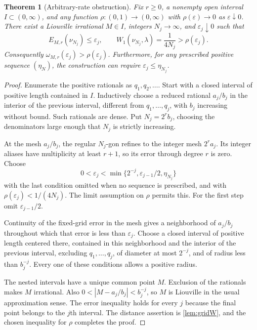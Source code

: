 \documentclass[11pt,a4paper]{article}
\numberwithin{equation}{section}
\theoremstyle{plain}
\newtheorem{theorem}{Theorem}[section]
\theoremstyle{definition}
\theoremstyle{remark}
\begin{document}
\begin{theorem}[Arbitrary-rate obstruction]\label{thm:liouville}
Fix $r\ge0$, a nonempty open interval $I\subset(0,\infty)$, and any function
$\rho:(0,1)\to(0,\infty)$ with $\rho(\varepsilon)\to0$ as
$\varepsilon\downarrow0$. There exist a Liouville irrational $M\in I$,
integers $N_j\to\infty$, and $\varepsilon_j\downarrow0$ such that
\begin{equation}\label{eq:liouville}
 E_{M,r}(\nu_{N_j})\le\varepsilon_j,
 \qquad
 W_1(\nu_{N_j},\lambda)=\frac1{4N_j}>\rho(\varepsilon_j).
\end{equation}
Consequently $\omega_{M,r}(\varepsilon_j)>\rho(\varepsilon_j)$.
Furthermore, for any prescribed positive sequence $(\eta_N)$, the construction
can require $\varepsilon_j\le\eta_{N_j}$.
\end{theorem}
\begin{proof}
Enumerate the positive rationals as $q_1,q_2,\ldots$. Start with a closed
interval of positive length contained in $I$. Inductively choose a reduced
rational $a_j/b_j$ in the interior of the previous interval, different from
$q_1,\ldots,q_j$, with $b_j$ increasing without bound. Such rationals are
dense. Put $N_j=2^r b_j$, choosing the denominators large enough that $N_j$
is strictly increasing.

At the mesh $a_j/b_j$, the regular $N_j$-gon refines to the integer mesh
$2^r a_j$. Its integer aliases have multiplicity at least $r+1$, so its
error through degree $r$ is zero. Choose
\[
 0<\varepsilon_j<\min\{2^{-j},\varepsilon_{j-1}/2,\eta_{N_j}\}
\]
with the last condition omitted when no sequence is prescribed, and with
$\rho(\varepsilon_j)<1/(4N_j)$. The limit assumption on $\rho$ permits this.
For the first step omit $\varepsilon_{j-1}/2$.

Continuity of the fixed-grid error in the mesh gives a neighborhood of
$a_j/b_j$ throughout which that error is less than $\varepsilon_j$.
Choose a closed interval of positive length centered there, contained in
this neighborhood and the interior of the previous interval, excluding
$q_1,\ldots,q_j$, of diameter at most $2^{-j}$, and of radius less than
$b_j^{-j}$. Every one of these conditions allows a positive radius.

The nested intervals have a unique common point $M$. Exclusion of the
rationals makes $M$ irrational. Also
$0<|M-a_j/b_j|<b_j^{-j}$, so $M$ is Liouville in the usual approximation
sense. The error inequality holds for every $j$ because the final point
belongs to the $j$th interval. The distance assertion is
\cref{lem:gridW}, and the chosen inequality for $\rho$ completes the proof.
\end{proof}
\end{document}
